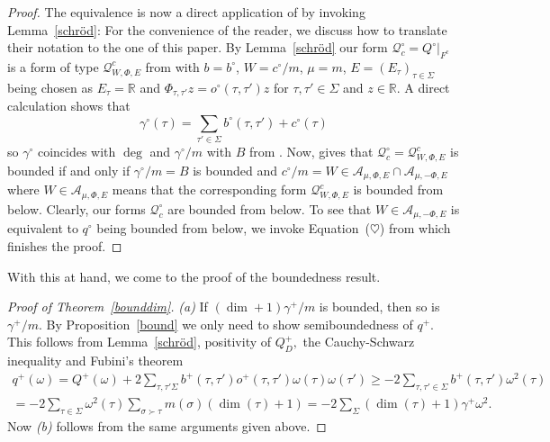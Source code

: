 \documentclass[10pt]{amsart}
\theoremstyle{definition}
\renewcommand{\bullet}{{\circ}}
\newcommand{\Q}{\mathcal{Q}}
\begin{document}
\begin{proof}
     The equivalence is now a direct application of \cite[Theorem~4.1]{S} by invoking Lemma~\ref{schröd}: For the convenience of the reader, we discuss how to translate their notation to the one of this paper. By Lemma~\ref{schröd} our form $\Q^{\bullet}_{c}=Q^{\bullet}\vert_{F^{c}}$ is a form of type $\Q^{c}_{W,\Phi,E}$ from \cite{S}     with $b=b^{\bullet}$, $W=c^{\bullet}/m$, $\mu=m$, $E=(E_{\tau})_{\tau\in\Sigma}$ being chosen as $E_{\tau}=\mathbb{R}$ and $\Phi_{\tau,\tau'}z=o^{\bullet}(\tau,\tau')z$ for $\tau,\tau'\in \Sigma$ and $z\in \mathbb{R}$.
    A direct calculation shows that
    \begin{equation*}
    	\gamma^{\bullet}(\tau)= \sum_{\tau'\in \Sigma}{b^\bullet(\tau,\tau')}+{c^\bullet(\tau)} 
    \end{equation*}
    so $\gamma^{\bullet}$ coincides with $\deg$ and $\gamma^{\bullet}/m$ with $B$ from \cite[Theorem~4.1]{S}.  Now, \cite[Theorem~4.1~(i)]{S} gives that $\Q^{\bullet}_{c}=\Q^{c}_{W,\Phi,E}$ is bounded if and only if $\gamma^{\bullet}/m=B$ is bounded and  $c^{\bullet}/m=W\in \mathcal{A}_{\mu,\Phi,E}\cap\mathcal{A}_{\mu,-\Phi,E} $ where $W\in \mathcal{A}_{\mu,\Phi,E}$ means that the corresponding form $\mathcal{Q}^{c}_{W,\Phi,E}$ is bounded from below. Clearly, our forms $\Q_{c}^{\bullet}$ are bounded from below. To see that $W\in \mathcal{A}_{\mu,-\Phi,E}$ is equivalent to $q^{\bullet}$ being bounded from below, we invoke Equation~($\heartsuit$) from \cite{S} which finishes the proof.
\end{proof}


With this at hand, we come to the proof of the boundedness result.

\begin{proof}[Proof of Theorem~\ref{bounddim}] \emph{(a)}
    If $(\dim+1)\gamma^{+}\slash m$ is bounded, then so is $\gamma^{+}\slash m.$ By Proposition~\ref{bound} we only need to show semiboundedness of $q^+.$ This follows from Lemma~\ref{schröd}, positivity of $Q^+_{D},$ the Cauchy-Schwarz inequality and Fubini's theorem
    \begin{multline*}
        q^+(\omega)  = Q^+(\omega) +2\sum_{\tau,\tau'\Sigma}b^+(\tau,\tau')o^+(\tau,\tau')\omega(\tau)\omega(\tau')
        \geq-2\sum_{\tau,\tau'\in \Sigma}b^+(\tau,\tau')\omega^2(\tau)\\= -2\sum_{ \tau\in\Sigma}\omega^2(\tau)\sum_{\sigma\succ\tau}m(\sigma)(\dim(\tau)+1)=-2\sum_\Sigma (\dim(\tau)+1)\gamma^{+}\omega^2.
    \end{multline*}
  Now \emph{(b)} follows from the same arguments given above.
\end{proof}
\end{document}

